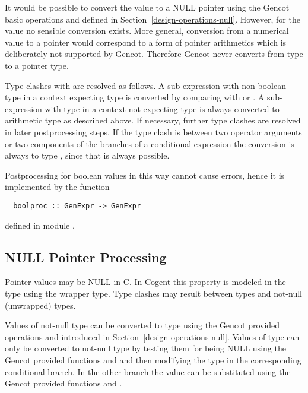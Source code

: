 It would be possible to convert the value  to a NULL pointer using the Gencot basic operations  and
 defined in Section~\ref{design-operations-null}. However, for the value  no sensible conversion exists.
More general, conversion from a numerical value to a pointer would correspond to a form of pointer arithmetics which is
deliberately not supported by Gencot. Therefore Gencot never converts from type  to a pointer type.

Type clashes with  are resolved as follows. A sub-expression with non-boolean type in a context expecting type 
is converted by comparing with  or . A sub-expression with type  in a context not expecting
type  is always converted to arithmetic type  as described above. If necessary, further type clashes are resolved
in later postprocessing steps. If the type clash is between two operator arguments
or two components of the branches of a conditional expression the conversion is always to type , since that is always
possible.

Postprocessing for boolean values in this way cannot cause errors, hence it is implemented by the function
\begin{verbatim}
  boolproc :: GenExpr -> GenExpr
\end{verbatim}
defined in module .

\subsection{NULL Pointer Processing}
\label{impl-post-null}

Pointer values may be NULL in C. In Cogent this property is modeled in the type using the  wrapper type. Type clashes
may result between  types and not-null (unwrapped) types.

Values of not-null type can be converted to  type using the Gencot provided operations  and 
introduced in Section~\ref{design-operations-null}. Values of  type can only be converted to not-null type by testing them
for being NULL using the Gencot provided functions  and  and then modifying the type in the corresponding
conditional branch. In the other branch the value can be substituted using the Gencot provided functions  and .

